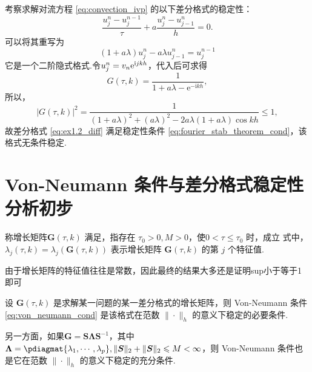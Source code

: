 \begin{instance}
    考察求解对流方程 \eqref{eq:convection_ivp} 的以下差分格式的稳定性：
    \begin{equation}
        \frac{u_j^n - u_j^{n-1}}{\tau} + a \frac{u_j^n - u_{j-1}^n}{h} = 0. \label{eq:ex1.2_diff}
    \end{equation}
    可以将其重写为
    \[(1+a\lambda)u_j^n-a\lambda u_{j-1}^n=u_j^{n-1}\]
    它是一个二阶隐式格式.令$u_j^n=v_n\mathrm{e}^{\mathrm{i} jkh}$，代入后可求得
    \[ G(\tau,k) = \frac{1}{1+a\lambda - \mathrm{e}^{-\mathrm{i}kh}}, \]
    所以，
    \[ |G(\tau,k)|^2 = \frac{1}{(1+a\lambda)^2 + (a\lambda)^2 - 2a\lambda(1+a\lambda)\cos kh} \leq 1, \]
    故差分格式 \eqref{eq:ex1.2_diff} 满足稳定性条件 \eqref{eq:fourier_stab_theorem_cond}，该格式无条件稳定.
\end{instance}

\section{Von-Neumann 条件与差分格式稳定性分析初步}

\begin{definition}
    称增长矩阵$\bm{G}(\tau,k)$ 满足，指存在 $\tau_0>0,M>0$，使$0<\tau \leq \tau_0$ 时，成立
    式中，$\lambda_j(\tau,k) = \lambda_j(\bm{G}(\tau,k))$ 表示增长矩阵 $\bm{G}(\tau,k)$ 的第 $j$ 个特征值.
\end{definition}
\begin{note}
    由于增长矩阵的特征值往往是常数，因此最终的结果大多还是证明sup小于等于1即可
\end{note}
\begin{theorem}
    设 $\bm{G}(\tau,k)$ 是求解某一问题的某一差分格式的增长矩阵，则 Von-Neumann 条件 \eqref{eq:von_neumann_cond} 是该格式在范数 $\|\cdot\|_h$ 的意义下稳定的必要条件.\par
    另一方面，如果$\bm{G}=\bm{S\Lambda S}^{-1}$，其中$\bm{\Lambda}=\pdiagmat{\lambda_1,\cdots,\lambda_p},\|\bm{S}\|_2+\|\bm{S}\|_2\leq M<\infty$，则 Von-Neumann 条件也是它在范数 $\|\cdot\|_h$ 的意义下稳定的充分条件.
\end{theorem}

